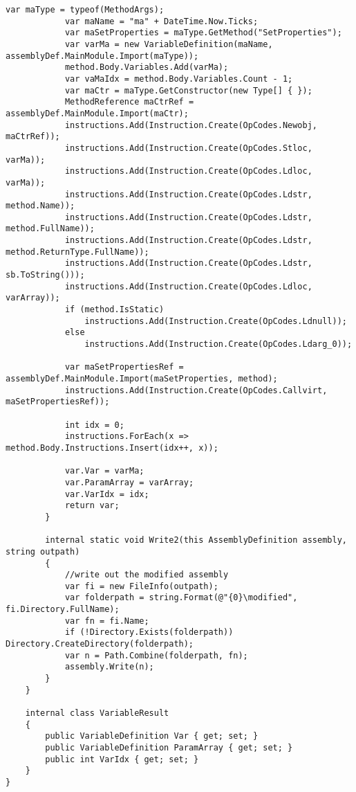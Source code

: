 \begin{lstlisting}[caption={../buffalo/Extensions/Extensions.cs}, label=../buffalo/Extensions/Extensions.cs, frame=tb, basicstyle=\scriptsize]
            var maType = typeof(MethodArgs);
            var maName = "ma" + DateTime.Now.Ticks;
            var maSetProperties = maType.GetMethod("SetProperties");
            var varMa = new VariableDefinition(maName, assemblyDef.MainModule.Import(maType));
            method.Body.Variables.Add(varMa);
            var vaMaIdx = method.Body.Variables.Count - 1;
            var maCtr = maType.GetConstructor(new Type[] { });
            MethodReference maCtrRef = assemblyDef.MainModule.Import(maCtr);
            instructions.Add(Instruction.Create(OpCodes.Newobj, maCtrRef));
            instructions.Add(Instruction.Create(OpCodes.Stloc, varMa));
            instructions.Add(Instruction.Create(OpCodes.Ldloc, varMa));
            instructions.Add(Instruction.Create(OpCodes.Ldstr, method.Name));
            instructions.Add(Instruction.Create(OpCodes.Ldstr, method.FullName));
            instructions.Add(Instruction.Create(OpCodes.Ldstr, method.ReturnType.FullName));
            instructions.Add(Instruction.Create(OpCodes.Ldstr, sb.ToString()));
            instructions.Add(Instruction.Create(OpCodes.Ldloc, varArray));
            if (method.IsStatic)
                instructions.Add(Instruction.Create(OpCodes.Ldnull));
            else
                instructions.Add(Instruction.Create(OpCodes.Ldarg_0));

            var maSetPropertiesRef = assemblyDef.MainModule.Import(maSetProperties, method);
            instructions.Add(Instruction.Create(OpCodes.Callvirt, maSetPropertiesRef));

            int idx = 0;
            instructions.ForEach(x => method.Body.Instructions.Insert(idx++, x));

            var.Var = varMa;
            var.ParamArray = varArray;
            var.VarIdx = idx;
            return var;
        }

        internal static void Write2(this AssemblyDefinition assembly, string outpath)
        {
            //write out the modified assembly
            var fi = new FileInfo(outpath);
            var folderpath = string.Format(@"{0}\modified", fi.Directory.FullName);
            var fn = fi.Name;
            if (!Directory.Exists(folderpath)) Directory.CreateDirectory(folderpath);
            var n = Path.Combine(folderpath, fn);
            assembly.Write(n);
        }
    }

    internal class VariableResult
    {
        public VariableDefinition Var { get; set; }
        public VariableDefinition ParamArray { get; set; }
        public int VarIdx { get; set; }
    }
}
\end{lstlisting}


